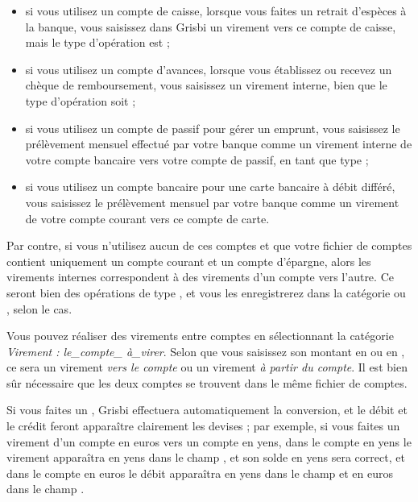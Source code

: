 \begin{itemize}
	\item si vous utilisez un compte de caisse, lorsque vous faites un retrait d'espèces à la banque, vous saisissez dans Grisbi un virement vers ce compte de caisse, mais le type d'opération est  ;
	\item si vous utilisez un compte d'avances, lorsque vous établissez ou recevez un chèque de remboursement, vous saisissez un virement interne, bien que le type d'opération soit  ;
	\item si vous utilisez un compte de passif pour gérer un emprunt, vous saisissez le prélèvement mensuel effectué par votre banque comme un virement interne de votre compte bancaire vers votre compte de passif, en tant que type  ;
	\item si vous utilisez un compte bancaire pour une carte bancaire à débit différé, vous saisissez le prélèvement mensuel par votre banque comme un virement de votre compte courant vers ce compte de carte.
\end{itemize}

Par contre, si vous n'utilisez aucun de ces comptes et que votre fichier de comptes contient uniquement un compte courant et un compte d'épargne, alors les virements internes correspondent à des virements d'un compte vers l'autre. Ce seront bien des opérations de type , et vous les enregistrerez dans la catégorie  ou , selon le cas. 

Vous pouvez réaliser des virements entre comptes en sélectionnant la catégorie \emph{Virement : le\_compte\_ à\_virer}. Selon que vous saisissez son montant en  ou en , ce sera un virement \emph{vers le compte} ou un virement \emph{à partir du compte}. Il est bien sûr nécessaire que les deux comptes se trouvent dans le même fichier de comptes.

Si vous faites un , Grisbi effectuera automatiquement la conversion, et le débit et le crédit feront apparaître clairement les devises ; par exemple, si vous faites un virement d'un compte en euros vers un compte en yens, dans le compte en yens le virement apparaîtra en yens dans le champ , et son solde en yens sera correct, et dans le compte en euros le débit apparaîtra en yens dans le champ  et en euros dans le champ .

